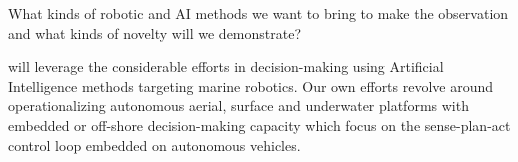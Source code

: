 What kinds of robotic and AI methods we want to bring to make the observation and what kinds of novelty will we demonstrate?

\proj will leverage the considerable efforts in decision-making using
Artificial Intelligence methods targeting marine robotics. Our own
efforts revolve around operationalizing autonomous aerial, surface and
underwater platforms with embedded or off-shore decision-making capacity
which focus on the sense-plan-act control loop embedded on autonomous
vehicles.
